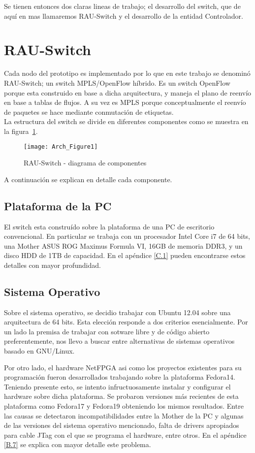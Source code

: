 Se tienen entonces dos claras lineas de trabajo; el desarrollo del switch, que de aquí en mas llamaremos RAU-Switch y el desarrollo de la entidad Controlador. 

\section{RAU-Switch}
Cada nodo del prototipo es implementado por lo que en este trabajo se denomin\'o RAU-Switch; un switch MPLS/OpenFlow híbrido. Es un switch OpenFlow porque esta construido en base a dicha arquitectura, y maneja el plano de reenvío en base a tablas de flujos. A su vez es MPLS porque conceptualmente el reenvío de paquetes se hace mediante conmutación de etiquetas.\\

La estructura del switch se divide en diferentes componentes como se muestra en la figura~\ref{fig:OpenSourceRArch}.

\newpage
\begin{figure}[htbp!] 
\centering    
\texttt{[image: Arch\_Figure1]}
\caption[RAU-Switch - diagrama de componentes]{RAU-Switch - diagrama de componentes}
\label{fig:OpenSourceRArch}
\end{figure}

A continuación se explican en detalle cada componente.

\subsection{Plataforma de la PC}
El switch esta constru\'ido sobre la plataforma de una PC de escritorio convencional. En particular se trabaja con un procesador Intel Core i7 de 64 bits, una Mother ASUS ROG Maximus Formula VI, 16GB de memoria DDR3, y un disco HDD de 1TB de capacidad. En el apéndice \ref{C.1} pueden encontrarse estos detalles con mayor profundidad.

\subsection{Sistema Operativo}
Sobre el sistema operativo, se decidio trabajar con Ubuntu 12.04 sobre una arquitectura de 64 bits. Esta elecci\'on responde a dos criterios esencialmente. Por un lado la premisa de trabajar con sotware libre y de c\'odigo abierto preferentemente, nos llevo a buscar entre alternativas de sistemas operativos basado en GNU/Linux.

Por otro lado, el hardware NetFPGA asi como los proyectos existentes para su programaci\'on fueron desarrollados trabajando sobre la plataforma Fedora14. Teniendo presente esto, se intento infructuosamente instalar y configurar el hardware sobre dicha plataforma. Se probaron versiones m\'as recientes de esta plataforma como Fedora17 y Fedora19 obteniendo los mismos resultados. Entre las causas se detectaron incompatibilidades entre la Mother de la PC y algunas de las versiones del sistema operativo mencionado, falta de drivers apropiados para cable JTag con el que se programa el hardware, entre otros. En el apéndice \ref{B.7} se explica con mayor detalle este problema.

